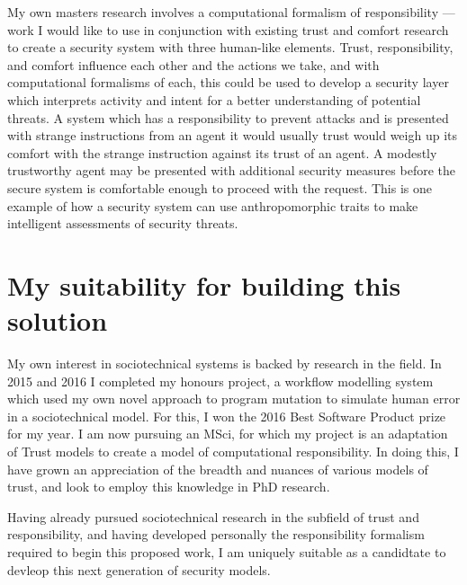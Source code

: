 \documentclass{tufte-handout}
\begin{document}
My own masters research involves a computational formalism of responsibility --- work I would like to use in conjunction with existing trust and comfort research to create a security system with three human-like elements. Trust, responsibility, and comfort influence each other and the actions we take, and with computational formalisms of each, this could be used to develop a security layer which interprets activity and intent for a better understanding of potential threats. A system which has a responsibility to prevent attacks and is presented with strange instructions from an agent it would usually trust would weigh up its comfort with the strange instruction against its trust of an agent. A modestly trustworthy agent may be presented with additional security measures before the secure system is comfortable enough to proceed with the request. This is one example of how a security system can use anthropomorphic traits to make intelligent assessments of security threats.\par

\section{My suitability for building this solution}
My own interest in sociotechnical systems is backed by research in the field. In 2015 and 2016 I completed my honours project, a workflow modelling system which used my own novel approach to program mutation to simulate human error in a sociotechnical model. For this, I won the 2016 Best Software Product prize for my year. I am now pursuing an MSci, for which my project is an adaptation of Trust models to create a model of computational responsibility. In doing this, I have grown an appreciation of the breadth and nuances of various models of trust, and look to employ this knowledge in PhD research.\par

Having already pursued sociotechnical research in the subfield of trust and responsibility, and having developed personally the responsibility formalism required to begin this proposed work, I am uniquely suitable as a candidtate to devleop this next generation of security models. 

\listoftodos[Things To Do]


\end{document}
